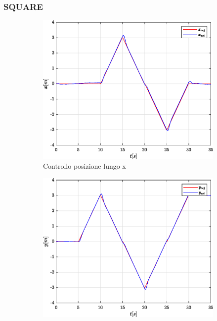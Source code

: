 \subsubsection{SQUARE}
\begin{figure}
	\centering
	\begin{subfigure}{0.45\textwidth}
		\centering
		\includegraphics[width=1\textwidth]{Simulazioni/Figure/SMC/SQUARE/PositionControlXPos}
		\caption{Controllo posizione lungo x}
		\label{fig:SQUAREerrposxSMC}
	\end{subfigure}
	\hfill
	\begin{subfigure}{0.45\textwidth}
		\centering
		\includegraphics[width=1\textwidth]{Simulazioni/Figure/SMC/SQUARE/PositionControlYPos}

\end{subfigure}
\end{figure}
